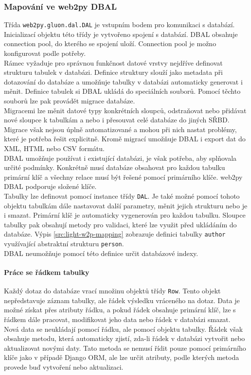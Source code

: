 \documentclass[ing,male,java,dept456]{diploma}						%
\begin{document}
\subsubsection{Mapování ve web2py DBAL}
Třída \lstinline[style=inlinepython]|web2py.gluon.dal.DAL| je vstupním bodem pro komunikaci s databází. Inicializací objektu této třídy je vytvořeno spojení s databází. DBAL obsahuje connection pool, do kterého se spojení uloží. Connection pool je možno konfigurovat podle potřeby. \\
Rámec vyžaduje pro správnou funkčnost datové vrstvy nejdříve definovat strukturu tabulek v databázi. Definice struktury slouží jako metadata při dotazování do databáze a umožňuje tabulky v databázi automaticky generovat i měnit. Definice tabulek si DBAL ukládá do speciálních souborů. Pomocí těchto souborů lze pak provádět migrace databáze. \\
Migracemi lze měnit datové typy konkrétních sloupců, odstraňovat nebo přidávat nové sloupce k tabulkám a nebo i přesouvat celé databáze do jiných SŘBD. Migrace však nejsou úplně automatizované a mohou při nich nastat problémy, které je potřeba řešit explicitně. Kromě migrací umožňuje DBAL i export dat do XML, HTML nebo CSV formátu. \\
DBAL umožňuje používat i existující databázi, je však potřeba, aby splňovala určité podmínky. Konkrétně musí databáze obsahovat pro každou tabulku primární klíč a všechny relace musí být řešené pomocí primárního klíče. web2py DBAL podporuje složené klíče. \\
Tabulky lze definovat pomocí instance třídy \lstinline[style=inlinepython]|DAL|. Je také možné pomocí tohoto objektu tabulkám dále nastavovat další parametry, měnit jejich strukturu nebo je i smazat. Primární klíč je automaticky vygenerován pro každou tabulku. Sloupce tabulky pak obsahují metody pro validaci, které lze využit před ukládáním do databáze. Výpis \ref{src:light-w2p-mapping} zobrazuje definici tabulky \lstinline[style=inlinepython]|author| využívající abstraktní strukturu \lstinline[style=inlinepython]|person|. \\
DBAL neumožňuje pomocí této definice určit databázové indexy.

\paragraph{Práce se řádkem tabulky}
\label{par:Row}
Každý dotaz do databáze vrací množinu objektů třídy \lstinline[style=inlinepython]|Row|. Tento objekt nepředstavuje záznam tabulky, ale řádek výsledku vráceného na dotaz. Data je možné získat přes atributy řádku, a pokud řádek obsahuje primární klíč, lze s řádkem dále pracovat, modifikovat jeho data nebo řádek v databázi smazat. \\
Nová data se neukládají pomocí řádku, ale pomocí objektu tabulky. Řádek však obsahuje metodu, která automaticky zjistí, zda-li řádek v databázi vytvořit nebo aktualizovat novými daty. Tato metoda se nemusí řídit pouze pomocí primárního klíče jako v případě Django ORM, ale lze určit atributy, podle kterých metoda provede buď vytvoření nebo aktualizaci.
\end{document}
